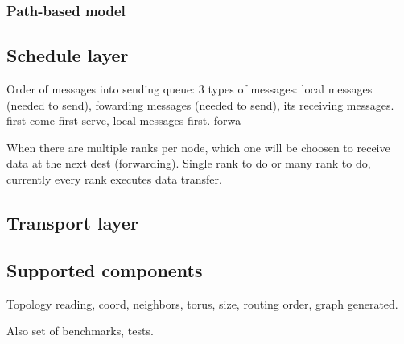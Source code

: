 \subsubsection{Path-based model}

\subsection{Schedule layer}
Order of messages into sending queue: 3 types of messages: local messages (needed to send), fowarding messages (needed to send), its receiving messages. first come first serve, local messages first. forwa

When there are multiple ranks per node, which one will be choosen to receive data at the next dest (forwarding). Single rank to do or many rank to do, currently every rank executes data transfer.

\subsection{Transport layer}

\subsection{Supported components}

Topology reading, coord, neighbors, torus, size, routing order, graph generated.

Also set of benchmarks, tests.
